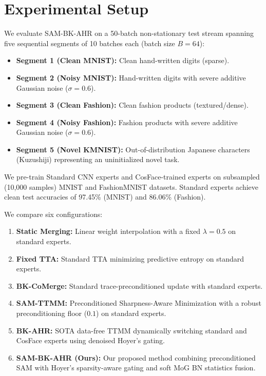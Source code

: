 \documentclass{article}
\theoremstyle{plain}
\theoremstyle{definition}
\theoremstyle{remark}
\begin{document}
\section{Experimental Setup}
\label{sec:experiments}
We evaluate SAM-BK-AHR on a 50-batch non-stationary test stream spanning five sequential segments of 10 batches each (batch size $B=64$):
\begin{itemize}
    \item \textbf{Segment 1 (Clean MNIST):} Clean hand-written digits (sparse).
    \item \textbf{Segment 2 (Noisy MNIST):} Hand-written digits with severe additive Gaussian noise ($\sigma=0.6$).
    \item \textbf{Segment 3 (Clean Fashion):} Clean fashion products (textured/dense).
    \item \textbf{Segment 4 (Noisy Fashion):} Fashion products with severe additive Gaussian noise ($\sigma=0.6$).
    \item \textbf{Segment 5 (Novel KMNIST):} Out-of-distribution Japanese characters (Kuzushiji) representing an uninitialized novel task.
\end{itemize}

We pre-train Standard CNN experts and CosFace-trained experts on subsampled (10,000 samples) MNIST and FashionMNIST datasets. Standard experts achieve clean test accuracies of 97.45\% (MNIST) and 86.06\% (Fashion).

We compare six configurations:
\begin{enumerate}
    \item \textbf{Static Merging:} Linear weight interpolation with a fixed $\lambda = 0.5$ on standard experts.
    \item \textbf{Fixed TTA:} Standard TTA minimizing predictive entropy on standard experts.
    \item \textbf{BK-CoMerge:} Standard trace-preconditioned update with standard experts.
    \item \textbf{SAM-TTMM:} Preconditioned Sharpness-Aware Minimization with a robust preconditioning floor ($0.1$) on standard experts.
    \item \textbf{BK-AHR:} SOTA data-free TTMM dynamically switching standard and CosFace experts using denoised Hoyer's gating.
    \item \textbf{SAM-BK-AHR (Ours):} Our proposed method combining preconditioned SAM with Hoyer's sparsity-aware gating and soft MoG BN statistics fusion.
\end{enumerate}
\end{document}
